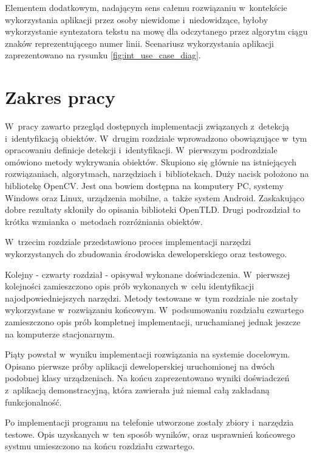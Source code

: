 Elementem dodatkowym, nadającym sens całemu rozwiązaniu w~kontekście
wykorzystania aplikacji przez osoby niewidome i~niedowidzące,
byłoby wykorzystanie syntezatora tekstu na mowę dla 
odczytanego przez algorytm ciągu znaków reprezentującego numer linii. 
Scenariusz wykorzystania aplikacji zaprezentowano na rysunku
\ref{fig:int_use_case_diag}.


\section{Zakres pracy}

W~pracy zawarto przegląd dostępnych implementacji związanych
z~detekcją i~identyfikacją obiektów. W~drugim rozdziale 
wprowadzono obowiązujące
w~tym opracowaniu definicje detekcji i~identyfikacji. 
W~pierwszym podrozdziale omówiono metody wykrywania obiektów.
Skupiono się
głównie na istniejących rozwiązaniach, algorytmach, narzędziach 
i~bibliotekach. Duży nacisk położono na bibliotekę OpenCV. 
Jest ona bowiem dostępna na komputery PC, systemy Windows oraz Linux, 
urządzenia
mobilne, a~także system Android. Zaskakująco dobre
rezultaty skłoniły do opisania biblioteki OpenTLD. 
Drugi podrozdział to krótka wzmianka o~metodach
rozróżniania obiektów.

W~trzecim rozdziale przedstawiono proces implementacji
narzędzi wykorzystanych do zbudowania środowiska deweloperskiego
oraz testowego.

Kolejny - czwarty rozdział - opisywał wykonane doświadczenia.
W~pierwszej kolejności zamieszczono opis 
prób wykonanych w~celu identyfikacji najodpowiedniejszych 
narzędzi. Metody testowane 
w~tym rozdziale nie zostały wykorzystane w~rozwiązaniu końcowym.
W~podsumowaniu rozdziału czwartego zamieszczono opis prób kompletnej
implementacji, uruchamianej jednak jeszcze na komputerze stacjonarnym.

Piąty powstał w~wyniku implementacji rozwiązania na 
systemie docelowym. Opisano pierwsze próby aplikacji deweloperskiej
uruchomionej na dwóch podobnej klasy urządzeniach. Na końcu
zaprezentowano wyniki doświadczeń z~aplikacją demonstracyjną,
która zawierała już niemal całą zakładaną funkcjonalność.

Po implementacji programu na telefonie utworzone zostały zbiory 
i~narzędzia testowe. Opis uzyskanych w~ten sposób wyników, oraz
usprawnień końcowego systmu umieszczono na końcu rozdziału czwartego.
